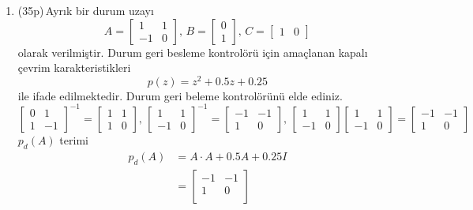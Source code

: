 \begin{enumerate}[\bfseries S1.]
    \item (35p)\,Ayrık bir durum uzayı
    \begin{equation}
        A=\begin{bmatrix}1& 1\\-1&0\end{bmatrix},\,B=\begin{bmatrix}0\\1\end{bmatrix},\,C=\begin{bmatrix}1&0\end{bmatrix}
    \end{equation}
    olarak verilmiştir. Durum geri besleme kontrolörü için amaçlanan kapalı çevrim karakteristikleri
    \begin{equation}
        p(z)=z^2+0.5z+0.25
    \end{equation}
    ile ifade edilmektedir. Durum geri beleme kontrolörünü elde ediniz.
    \begin{equation*}
        \begin{bmatrix}0& 1\\1&-1\end{bmatrix}^{-1}=\begin{bmatrix}1& 1\\1&0\end{bmatrix},\,
        \begin{bmatrix}1& 1\\-1&0\end{bmatrix}^{-1}=\begin{bmatrix}-1& -1\\1&0\end{bmatrix},\,
        \begin{bmatrix}1& 1\\-1&0\end{bmatrix}\begin{bmatrix}1& 1\\-1&0\end{bmatrix}=\begin{bmatrix}-1& -1\\1&0\end{bmatrix}
    \end{equation*}
    $p_d(A)$ terimi
    \begin{equation}
    \begin{split}
        p_d(A)&=A\cdot A+0.5A+0.25I\\
        &=\begin{bmatrix}
            -1&    -1\\
            1&    0\\

\end{bmatrix}
\end{split}
\end{equation}
\end{enumerate}
